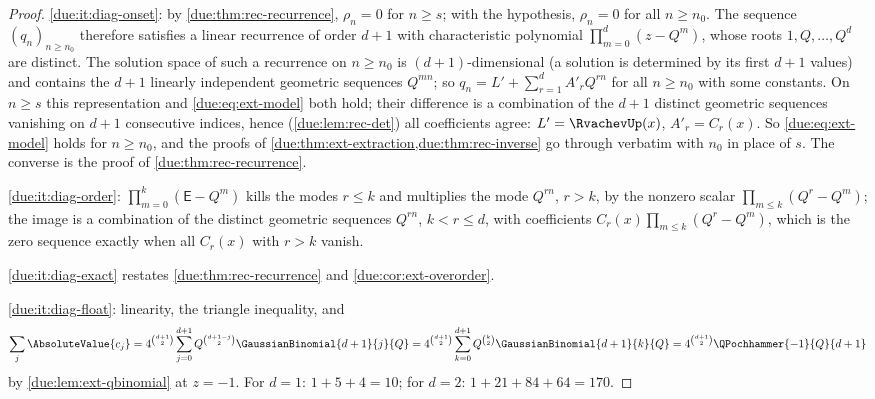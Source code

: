 \documentclass[11pt,oneside]{article}
\theoremstyle{plain}
\theoremstyle{definition}
\theoremstyle{remark}
\newcommand{\upn}[1]{\RvachevUp_{#1}}
\newcommand{\Qq}{Q}                                         %
\newcommand{\Cr}[2]{C_{#1}\!\left(#2\right)}                %
\newcommand{\qn}[1]{q_{#1}}                                 %
\begin{document}
\begin{proof}
\ref{due:it:diag-onset}: by \cref{due:thm:rec-recurrence}, $\rho_{n}=0$ for
$n\ge s$; with the hypothesis, $\rho_{n}=0$ for all $n\ge n_{0}$.  The
sequence $(\qn{n})_{n\ge n_{0}}$ therefore satisfies a linear recurrence of
order $d+1$ with characteristic polynomial $\prod_{m=0}^{d}(z-\Qq^{m})$, whose
roots $1,\Qq,\ldots,\Qq^{d}$ are distinct.  The solution space of such a
recurrence on $n\ge n_{0}$ is $(d+1)$-dimensional (a solution is determined
by its first $d+1$ values) and contains the $d+1$ linearly independent
geometric sequences $\Qq^{mn}$; so $\qn{n}=L'+\sum_{r=1}^{d}A'_{r}\Qq^{rn}$
for all $n\ge n_{0}$ with some constants.  On $n\ge s$ this representation
and \cref{due:eq:ext-model} both hold; their difference is a combination of
the $d+1$ distinct geometric sequences vanishing on $d+1$ consecutive indices,
hence (\cref{due:lem:rec-det}) all coefficients agree: $L'=\RvachevUp(x)$,
$A'_{r}=\Cr{r}{x}$.  So \cref{due:eq:ext-model} holds for $n\ge n_{0}$, and
the proofs of \cref{due:thm:ext-extraction,due:thm:rec-inverse} go through
verbatim with $n_{0}$ in place of $s$.  The converse is the proof of
\cref{due:thm:rec-recurrence}.

\ref{due:it:diag-order}: $\prod_{m=0}^{k}(\mathsf E-\Qq^{m})$ kills the modes
$r\le k$ and multiplies the mode $\Qq^{rn}$, $r>k$, by the nonzero scalar
$\prod_{m\le k}(\Qq^{r}-\Qq^{m})$; the image is a combination of the distinct
geometric sequences $\Qq^{rn}$, $k<r\le d$, with coefficients
$\Cr{r}{x}\prod_{m\le k}(\Qq^{r}-\Qq^{m})$, which is the zero sequence
exactly when all $\Cr{r}{x}$ with $r>k$ vanish.

\ref{due:it:diag-exact} restates \cref{due:thm:rec-recurrence} and
\cref{due:cor:ext-overorder}.

\ref{due:it:diag-float}: linearity, the triangle inequality, and
\[
 \sum_{j}\AbsoluteValue{c_{j}}
 =4^{\binom{d+1}{2}}\sum_{j=0}^{d+1}\Qq^{\binom{d+1-j}{2}}\GaussianBinomial{d+1}{j}{\Qq}
 =4^{\binom{d+1}{2}}\sum_{k=0}^{d+1}\Qq^{\binom{k}{2}}\GaussianBinomial{d+1}{k}{\Qq}
 =4^{\binom{d+1}{2}}\QPochhammer{-1}{\Qq}{d+1}
\]
by \cref{due:lem:ext-qbinomial} at $z=-1$.  For $d=1$: $1+5+4=10$; for
$d=2$: $1+21+84+64=170$.
\end{proof}
\end{document}
